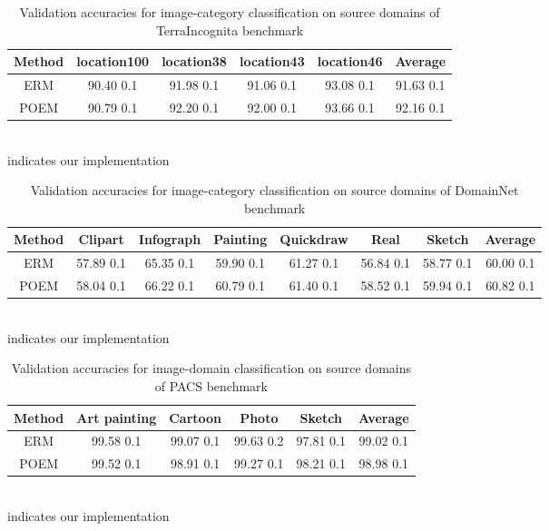 \documentclass[letterpaper]{article} \usepackage{aaai23}  \usepackage{times}  \usepackage{helvet}  \usepackage{courier}  \usepackage[hyphens]{url}  \usepackage{graphicx} \urlstyle{rm} \def\UrlFont{\rm}  \usepackage{natbib}  \usepackage{caption} \frenchspacing  \setlength{\pdfpagewidth}{8.5in}  \setlength{\pdfpageheight}{11in}  \usepackage[labelsep=period]{caption}
\begin{document}
\begin{table}[H]
\centering
	\begin{tabular}{ccccc|c}
		\toprule
		\textbf{Method} & location100 & location38 & location43 & location46 & Average\\
		\midrule
		ERM & 90.40  0.1 & 91.98  0.1 & 91.06  0.1 & 93.08  0.1 & 91.63  0.1\\
		POEM & 90.79  0.1 & 92.20  0.1 & 92.00  0.1 & 93.66  0.1 & 92.16  0.1\\
		\hline
	\end{tabular}
	\label{tab:category_terra}
	\footnotesize{\\ indicates our implementation}\\
        \caption{Validation accuracies for image-category classification on source domains of TerraIncognita benchmark}
\end{table}	


\begin{table}[H]
\centering
	\begin{tabular}{ccccccc|c}
		\toprule
		\textbf{Method} & Clipart & Infograph & Painting & Quickdraw & Real & Sketch & Average\\
		\midrule
		ERM & 57.89  0.1 & 65.35  0.1 & 59.90  0.1 & 61.27  0.1 & 56.84  0.1 & 58.77  0.1 & 60.00  0.1 \\
		POEM & 58.04  0.1 & 66.22  0.1 & 60.79  0.1 & 61.40  0.1 & 58.52  0.1 & 59.94  0.1 & 60.82  0.1 \\
		\hline
	\end{tabular}
	\footnotesize{\\ indicates our implementation}\\
        \caption{Validation accuracies for image-category classification on source domains of DomainNet benchmark}
        \label{tab:category_dn}
\end{table}	

\begin{table}[H]
\centering
	\begin{tabular}{ccccc|c}
		\toprule
		\textbf{Method} & Art painting & Cartoon & Photo & Sketch & Average\\
		\midrule
		ERM & 99.58  0.1 & 99.07  0.1 & 99.63  0.2 & 97.81  0.1 & 99.02  0.1\\
		POEM & 99.52  0.1 & 98.91  0.1 & 99.27  0.1 & 98.21  0.1 & 98.98  0.1\\
		\hline
	\end{tabular}
	\footnotesize{\\ indicates our implementation}\\
        \caption{Validation accuracies for image-domain classification on source domains of PACS benchmark}
        \label{tab:domain_pacs}
\end{table}	
\end{document}
